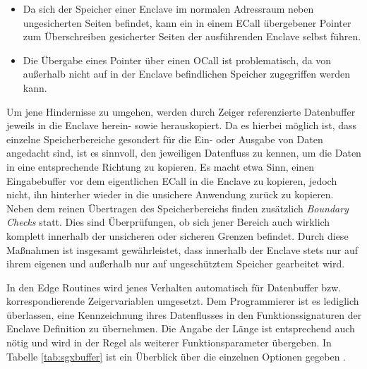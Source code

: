 \begin{itemize}
	\item Da sich der Speicher einer Enclave im normalen Adressraum neben ungesicherten Seiten befindet, kann ein in einem \ac{ECall} übergebener Pointer zum Überschreiben gesicherter Seiten der ausführenden Enclave selbst führen.
	\item Die Übergabe eines Pointer über einen \ac{OCall} ist problematisch, da von außerhalb nicht auf in der Enclave befindlichen Speicher zugegriffen werden kann.
\end{itemize}

Um jene Hindernisse zu umgehen, werden durch Zeiger referenzierte Datenbuffer jeweils in die Enclave herein- sowie herauskopiert. Da es hierbei möglich ist, dass einzelne Speicherbereiche gesondert für die Ein- oder Ausgabe von Daten angedacht sind, ist es sinnvoll, den jeweiligen Datenfluss zu kennen, um die Daten in eine entsprechende Richtung zu kopieren. Es macht etwa Sinn, einen Eingabebuffer vor dem eigentlichen \ac{ECall} in die Enclave zu kopieren, jedoch nicht, ihn hinterher wieder in die unsichere Anwendung  zurück zu kopieren. Neben dem reinen Übertragen des Speicherbereichs finden zusätzlich \textit{Boundary Checks} statt. Dies sind Überprüfungen, ob sich jener Bereich auch wirklich komplett innerhalb der unsicheren oder sicheren Grenzen befindet. Durch diese Maßnahmen ist insgesamt gewährleistet, dass innerhalb der Enclave stets nur auf ihrem eigenen und außerhalb nur auf ungeschütztem Speicher gearbeitet wird.

In den Edge Routines wird jenes Verhalten automatisch für Datenbuffer bzw. korrespondierende Zeigervariablen umgesetzt. Dem Programmierer ist es lediglich überlassen, eine Kennzeichnung ihres Datenflusses in den Funktionssignaturen der Enclave Definition zu übernehmen. Die Angabe der Länge ist entsprechend auch nötig und wird in der Regel als weiterer Funktionsparameter übergeben. In Tabelle \ref{tab:sgxbuffer} ist ein Überblick über die einzelnen Optionen gegeben \cite{LinuxGuide}.

